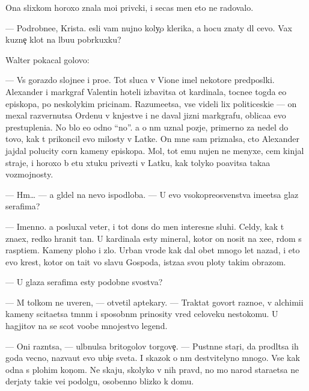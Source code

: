 \documentclass[10pt]{book}
\begin{document}
Ona slixkom horoxo znala mo{\y}i priv{\yi}cki, i se{\y}cas men{\ia} eto ne radovalo.

— Podrobne{\y}e, Krista. {\Y}esli vam nujno koly{\c}o klerika, {\y}a hocu znaty dl{\ia} cevo. Vax kuzne{\c} kl{\io}{\y}ot na l{\io}bu{\y}u pobr{\ia}kuxku?

Walter pokacal go\-lo\-vo{\y}:

— Vs{\e} gorazdo slojne{\y}e i pro{\x}e. Tot sluca{\y} v Vione imel nekotor{\yi}{\y}e pred\-pos{\yi}l\-ki. Alexander i markgraf Valentin hoteli izbavitsa ot kardinala, tocne{\y}e togda {\y}e{\x}o episkopa, po neskolykim pricinam. Razume{\y}etsa, vse videli lix politiceski{\y}e — on mexal razvernutsa Ordenu v kn{\ia}jestve i ne daval jizni markgrafu, oblica{\y}a {\y}evo prestupleni{\y}a. No b{\yi}lo {\y}e{\x}o odno ``no''. {\Y}a o n{\e}m uznal pozje, primerno za nedel{\io} do tovo, kak t{\yi} prikoncil {\y}evo milosty v Latke. On mne sam priznalsa, cto Alexander jajdal polucity corn{\yi}{\y} kameny episkopa. Mol, tot {\y}emu nujen ne menyxe, cem kinjal{\yi} straje{\y}, i horoxo b{\yi} etu xtuku privezti v Latku, kak tolyko po{\y}avitsa taka{\y}a vozmojnosty.

— Hm… — {\Y}a gl{\ia}del na nevo ispodlob{\y}a. — U {\y}evo v{\yi}soko\-preosv{\ia}{\x}en\-st\-va ime\-{\y}et\-sa glaz serafima?

— Imenno. {\Y}a posluxal veter, i tot don{\e}s do men{\ia} interesn{\yi}{\y}e sluhi. Cel{\ia}dy, kak t{\yi} zna\-{\y}ex, redko hranit ta{\y}n{\yi}. U kardinala {\y}esty mineral, kotor{\yi}{\y} on nosit na xe{\y}e, r{\ia}dom s rasp{\ia}ti{\y}em. Kameny ploho{\y} i zlo{\y}. Urban vrode kak dal obet mnogo let nazad, i eto {\y}evo krest, kotor{\yi}{\y} on ta{\x}it vo slavu Gospoda, ist{\ia}za{\y}a svo{\y}u ploty takim obrazom.

— U glaza serafima {\y}esty podobn{\yi}{\y}e svo{\y}stva?

— M{\yi} tolkom ne uveren{\yi}, — otvetil aptekary. — Traktat{\yi} govor{\ia}t razno{\y}e, v alchimi{\y}i kameny scita{\y}etsa t{\e}mn{\yi}m i sposobn{\yi}m prinosity vred celoveku ne\-sto{\y}\-ko\-mu. U hagjitov na se{\y} scot voob{\x}e mnojestvo legend.

— Oni razn{\ia}tsa, — ul{\yi}bnulsa britogolov{\yi}{\y} torgove{\c}. — Pust{\yi}nn{\yi}{\y}e star{\c}i, da prodl{\ia}tsa ih goda vecno, naz{\yi}va{\y}ut {\y}evo ubi{\y}{\c}e{\y} sveta. I skazok o n{\e}m de{\y}stvitelyno mnogo. Vse kak odna s plohim kon{\c}om. Ne skaju, skoly\-ko v nih pravd{\yi}, no mo{\y} narod stara{\y}etsa ne derjaty taki{\y}e ve{\x}i podolgu, osobenno blizko k domu.
\end{document}
